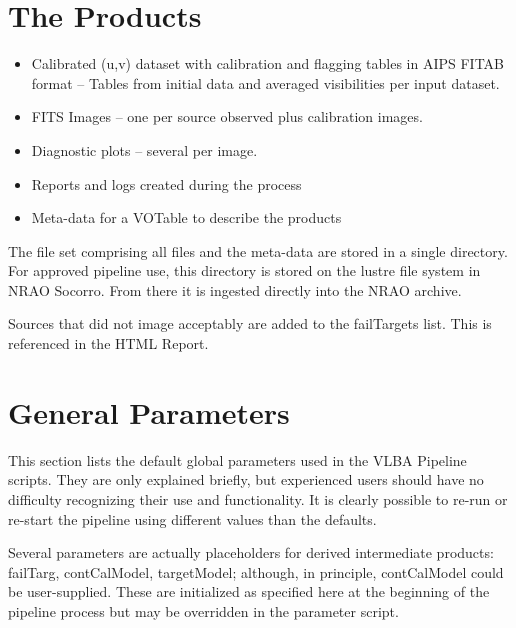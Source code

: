 \documentclass[11pt]{article}
\begin{document}
\section {The Products}

\begin{itemize}
\item Calibrated (u,v) dataset with calibration and flagging tables in
AIPS FITAB format -- Tables from initial data and averaged
visibilities per input dataset. 
\item FITS Images -- one per source observed plus calibration images.
\item Diagnostic plots -- several per image.
\item Reports and logs created during the process
\item Meta-data for a VOTable to describe the products
\end{itemize}

The file set comprising all files and the meta-data are stored in a single
directory.  For approved pipeline use, this directory is stored on the lustre
file system in NRAO Socorro.  From there it is ingested directly into the NRAO
archive.

Sources that did not image acceptably are added to the failTargets
list.  This is referenced in the HTML Report.

\clearpage
\appendix
\section{General Parameters}

This section lists the default global parameters used in the VLBA Pipeline
scripts.  They are only explained briefly, but experienced users should have no
difficulty recognizing their use and functionality.  It is clearly possible to
re-run or re-start the pipeline using different values than the defaults.

Several parameters are actually placeholders for derived intermediate products:
failTarg, contCalModel, targetModel; although, in principle, contCalModel could
be user-supplied.  These are initialized as specified here at the beginning of
the pipeline process but may be overridden in the parameter script.
\end{document}
